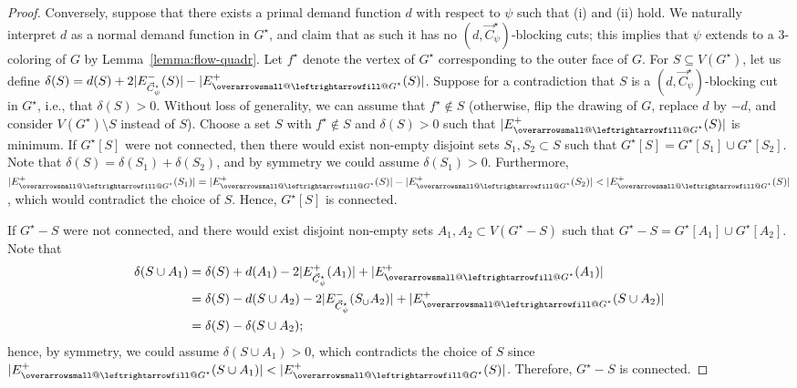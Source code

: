 \documentclass[12pt,twoside,openright,a4paper]{book}
\makeatletter
\newcommand{\ovlr}{\mathpalette{\overarrowsmall@\leftrightarrowfill@}}
\newcommand{\overarrowsmall@}[3]{%
  \vbox{%
    \ialign{%
      ##\crcr
      #1{\smaller@style{#2}}\crcr
      \noalign{\nointerlineskip}%
      $\m@th\hfil#2#3\hfil$\crcr
    }%
  }%
}
\def\smaller@style#1{%
  \ifx#1\displaystyle\scriptstyle\else
    \ifx#1\textstyle\scriptstyle\else
      \scriptscriptstyle
    \fi
  \fi
}
\makeatother
\begin{document}
\begin{proof}
Conversely, suppose that there exists a primal demand function $d$ with respect to $\psi$ such that
(i) and (ii) hold. We naturally interpret $d$ as a normal demand function in $G^\star$, and claim
that as such it has no $(d,\vec{C}^\star_\psi)$-blocking cuts; this implies that $\psi$ extends to a $3$-coloring of $G$
by Lemma~\ref{lemma:flow-quadr}.  Let $f^\star$ denote the vertex of $G^\star$ corresponding to the outer face of $G$.
For $S\subseteq V(G^\star)$, let us define $\delta(S)=d(S)+2|E_{\vec{C}^\star_\psi}^-(S)|-|E_{\ovlr{G^\star}}^+(S)|$.
Suppose for a contradiction that $S$ is a $(d,\vec{C}^\star_\psi)$-blocking cut in $G^\star$, i.e., that $\delta(S)>0$.
Without loss of generality, we can assume that $f^\star\not\in S$ (otherwise, flip the drawing of $G$, replace $d$ by $-d$, and
consider $V(G^\star)\setminus S$ instead of $S$).  Choose a set $S$ with $f^\star\not\in S$ and $\delta(S)>0$ such that $|E_{\ovlr{G^\star}}^+(S)|$ is minimum.
If $G^\star[S]$ were not connected, then there would exist non-empty disjoint sets $S_1,S_2\subset S$
such that $G^\star[S]=G^\star[S_1]\cup G^\star[S_2]$.  Note that $\delta(S)=\delta(S_1)+\delta(S_2)$, and by symmetry we could assume $\delta(S_1)>0$.
Furthermore, $|E_{\ovlr{G^\star}}^+(S_1)|=|E_{\ovlr{G^\star}}^+(S)|-|E_{\ovlr{G^\star}}^+(S_2)|<|E_{\ovlr{G^\star}}^+(S)|$, which would contradict
the choice of $S$.  Hence, $G^\star[S]$ is connected.

If $G^\star-S$ were not connected, and there would exist disjoint non-empty sets $A_1,A_2\subset V(G^\star-S)$
such that $G^\star-S=G^\star[A_1]\cup G^\star[A_2]$.  Note that
\begin{align*}
\delta(S\cup A_1)&= \delta(S)+d(A_1)-2|E_{\vec{C}^\star_\psi}^+(A_1)|+|E_{\ovlr{G^\star}}^+(A_1)|\\
&=\delta(S)-d(S\cup A_2)-2|E_{\vec{C}^\star_\psi}^-(S_\cup A_2)|+|E_{\ovlr{G^\star}}^+(S\cup A_2)|\\
&=\delta(S)-\delta(S\cup A_2);
\end{align*}
hence, by symmetry, we could assume $\delta(S\cup A_1)>0$, which contradicts the choice of $S$ since $|E_{\ovlr{G^\star}}^+(S\cup A_1)|<|E_{\ovlr{G^\star}}^+(S)|$.
Therefore, $G^\star-S$ is connected.


\end{proof}
\end{document}
